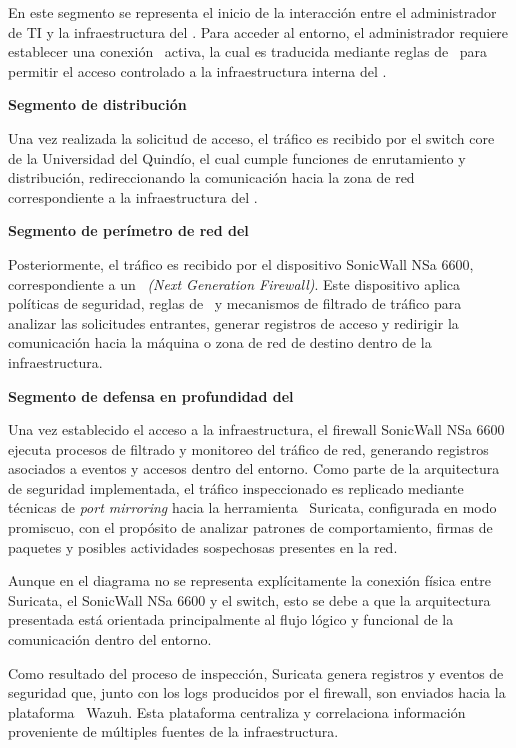 En este segmento se representa el inicio de la interacción entre el administrador de TI y la infraestructura del \GRID. Para acceder al 
entorno, el administrador requiere establecer una conexión \VPN\ activa, la cual es traducida mediante reglas de \DNAT\ para permitir el 
acceso controlado a la infraestructura interna del \GRID.

\textbf{Segmento de distribución}

Una vez realizada la solicitud de acceso, el tráfico es recibido por el switch core de la Universidad del Quindío, el cual cumple 
funciones de enrutamiento y distribución, redireccionando la comunicación hacia la zona de red correspondiente a la infraestructura del 
\GRID.

\textbf{Segmento de perímetro de red del \GRID}

Posteriormente, el tráfico es recibido por el dispositivo SonicWall NSa 6600, correspondiente a un \NGFW\ \textit{(Next Generation Firewall)}. 
Este dispositivo aplica políticas de seguridad, reglas de \NAT\ y mecanismos de filtrado de tráfico para analizar las solicitudes entrantes, 
generar registros de acceso y redirigir la comunicación hacia la máquina o zona de red de destino dentro de la infraestructura.

\textbf{Segmento de defensa en profundidad del \GRID}

Una vez establecido el acceso a la infraestructura, el firewall SonicWall NSa 6600 ejecuta procesos de filtrado y monitoreo del tráfico de 
red, generando registros asociados a eventos y accesos dentro del entorno. Como parte de la arquitectura de seguridad implementada, el 
tráfico inspeccionado es replicado mediante técnicas de \textit{port mirroring} hacia la herramienta \IDPS\ Suricata, configurada en modo 
promiscuo, con el propósito de analizar patrones de comportamiento, firmas de paquetes y posibles actividades sospechosas presentes en la 
red.

Aunque en el diagrama no se representa explícitamente la conexión física entre Suricata, el SonicWall NSa 6600 y el switch, esto se debe a 
que la arquitectura presentada está orientada principalmente al flujo lógico y funcional de la comunicación dentro del entorno.

Como resultado del proceso de inspección, Suricata genera registros y eventos de seguridad que, junto con los logs producidos por el 
firewall, son enviados hacia la plataforma \SIEM\ Wazuh. Esta plataforma centraliza y correlaciona información proveniente de múltiples 
fuentes de la infraestructura.

